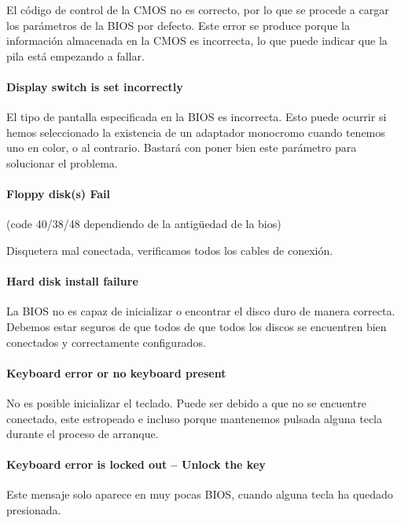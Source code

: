 \documentclass[12pt,oneside,a4paper]{article}
\begin{document}
			El código de control de la CMOS no es correcto, por lo que se
			procede a cargar los parámetros de la BIOS por defecto. Este error
			se produce porque la información almacenada en la CMOS es
			incorrecta, lo que puede indicar que la pila está empezando a
			fallar.

			\paragraph{Display switch is set incorrectly}

			El tipo de pantalla especificada en la BIOS es incorrecta. Esto puede ocurrir si hemos seleccionado la existencia de un adaptador monocromo cuando tenemos uno en color, o al contrario. Bastará con poner bien este parámetro para solucionar el problema.

			\paragraph{Floppy disk(s) Fail} 
			
			(code 40/38/48 dependiendo de la antigüedad de la bios)

			Disquetera mal conectada, verificamos todos los cables de conexión.

			\paragraph{Hard disk install failure}

			La BIOS no es capaz de inicializar o encontrar el disco duro de
			manera correcta. Debemos estar seguros de que todos de que todos
			los discos se encuentren bien conectados y correctamente
			configurados.

			\paragraph{Keyboard error or no keyboard present}

			No es posible inicializar el teclado. Puede ser debido a que no se
			encuentre conectado, este estropeado e incluso porque mantenemos
			pulsada alguna tecla durante el proceso de arranque.

			\paragraph{Keyboard error is locked out – Unlock the key}

			Este mensaje solo aparece en muy pocas BIOS, cuando alguna tecla ha
			quedado presionada. 
\end{document}
